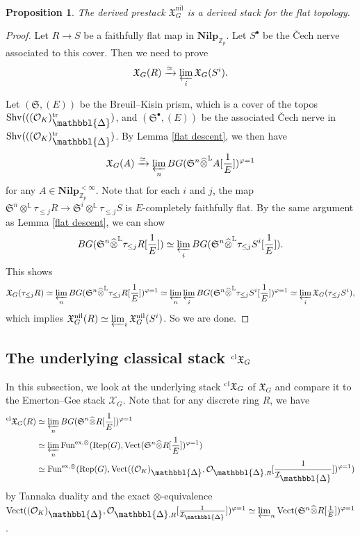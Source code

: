 \documentclass[10pt]{article}
\newtheorem{prop}[thm]{Proposition}
\numberwithin{equation}{section}
\newcommand{\frakS}{{\mathfrak S}}
\newcommand{\frakX}{{\mathfrak X}}
\newcommand{\bL}{{\mathbb L}}
\newcommand{\bZ}{{\mathbb Z}}
\newcommand{\calI}{{\mathcal I}}
\newcommand{\calO}{{\mathcal O}}
\newcommand{\calX}{{\mathcal X}}
\newcommand{\nil}{\mathrm{nil}}
\newcommand{\Rep}{{\mathrm{Rep}}}           %
\newcommand{\Vect}{{\mathrm{Vect}}}         %
\newcommand{\Prism}{{\mathlarger{\mathbbl{\Delta}}}} %
\newcommand{\Fun}{\mathrm{Fun}}
\begin{document}
\begin{prop}
    The derived prestack $\frakX_G^{\nil}$ is a derived stack for the flat topology.
\end{prop}
\begin{proof}
    Let $R\to S$ be a faithfully flat map in $\textbf{Nilp}_{\bZ_p}$. Let $S^{\bullet}$ be the \v Cech nerve associated to this cover. Then we need to prove
    \[
    \frakX_G(R)\xrightarrow{\simeq}\varprojlim_i\frakX_G(S^i).
    \]

Let $(\frakS,(E))$ be the Breuil--Kisin prism, which is a cover of the topos ${\rm Shv}(((\calO_K)_{\Prism}^{\rm tr})$, and $(\frakS^{\bullet},(E))$ be the associated \v Cech nerve in ${\rm Shv}(((\calO_K)_{\Prism}^{\rm tr})$. By Lemma \ref{flat descent}, we then have
\[
\frakX_G(A)\xrightarrow{\simeq}\varprojlim_nBG(\frakS^n\widehat\otimes^{\bL}A[\frac{1}{E}])^{\varphi=1}
\]
for any $A\in \textbf{Nilp}^{<\infty}_{\bZ_p}$. Note that for each $i$ and $j$, the map $\frakS^n\otimes^{\bL}\tau_{\leq j}R\to\frakS^i\otimes^{\bL}\tau_{\leq j}S $ is $E$-completely faithfully flat. By the same argument as Lemma \ref{flat descent}, we can show
\[
BG(\frakS^n\widehat\otimes^{\bL}\tau_{\leq j}R[\frac{1}{E}])\simeq \varprojlim_iBG(\frakS^n\widehat\otimes^{\bL}\tau_{\leq j}S^i[\frac{1}{E}]).
\]
This shows
\[
\frakX_G(\tau_{\leq j}R)\simeq \varprojlim_nBG(\frakS^n\widehat\otimes^{\bL}\tau_{\leq j}R[\frac{1}{E}])^{\varphi=1}\simeq \varprojlim_n\varprojlim_iBG(\frakS^n\widehat\otimes^{\bL}\tau_{\leq j}S^i[\frac{1}{E}])^{\varphi=1}\simeq \varprojlim_i\frakX_G(\tau_{\leq j}S^i),
\]
which implies $\frakX^{\nil}_G(R)\simeq \varprojlim_i\frakX_G^{\nil}(S^i)$. So we are done.
    
\end{proof}

\subsection{The underlying classical stack $^{\rm cl}\frakX_G$}
In this subsection, we look at the underlying stack $^{\rm cl}\frakX_G$ of $\frakX_G$ and compare it to the Emerton--Gee stack $\calX_G$. Note that for any discrete ring $R$, we have
\begin{equation*}
    \begin{split}
        ^{\rm cl}\frakX_G(R)& \simeq \varprojlim_nBG(\frakS^n\widehat\otimes R[\frac{1}{E}])^{\varphi=1}\\
        &\simeq \varprojlim_n\Fun^{\rm ex,\otimes}(\Rep(G),\Vect(\frakS^n\widehat\otimes R[\frac{1}{E}])^{\varphi=1})\\
        &\simeq \Fun^{\rm ex, \otimes}(\Rep(G),\Vect((\calO_K)_{\Prism},\calO_{\Prism,R}[\frac{1}{\calI_{\Prism}}])^{\varphi=1})
    \end{split}
\end{equation*}
by Tannaka duality and the exact $\otimes$-equivalence $\Vect((\calO_K)_{\Prism},\calO_{\Prism,R}[\frac{1}{\calI_{\Prism}}])^{\varphi=1}\simeq \varprojlim_n \Vect(\frakS^n\widehat\otimes R[\frac{1}{E}])^{\varphi=1}$.
\end{document}
